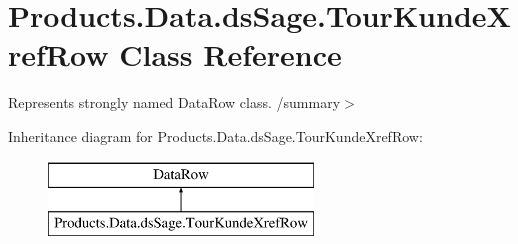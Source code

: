 \hypertarget{class_products_1_1_data_1_1ds_sage_1_1_tour_kunde_xref_row}{}\section{Products.\+Data.\+ds\+Sage.\+Tour\+Kunde\+Xref\+Row Class Reference}
\label{class_products_1_1_data_1_1ds_sage_1_1_tour_kunde_xref_row}


Represents strongly named Data\+Row class. /summary$>$  


Inheritance diagram for Products.\+Data.\+ds\+Sage.\+Tour\+Kunde\+Xref\+Row\+:\begin{figure}[H]
\begin{center}
\leavevmode
\includegraphics[height=2.000000cm]{class_products_1_1_data_1_1ds_sage_1_1_tour_kunde_xref_row}
\end{center}
\end{figure}
